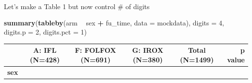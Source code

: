 \documentclass[fleqn,10pt,lineno]{wlpeerj} %
\newenvironment{Shaded}{\begin{snugshade}}{\end{snugshade}}
\newcommand{\DataTypeTok}[1]{\textcolor[rgb]{0.13,0.29,0.53}{#1}}
\newcommand{\DecValTok}[1]{\textcolor[rgb]{0.00,0.00,0.81}{#1}}
\newcommand{\KeywordTok}[1]{\textcolor[rgb]{0.13,0.29,0.53}{\textbf{#1}}}
\newcommand{\NormalTok}[1]{#1}
\newcommand{\OperatorTok}[1]{\textcolor[rgb]{0.81,0.36,0.00}{\textbf{#1}}}
\newcommand{\StringTok}[1]{\textcolor[rgb]{0.31,0.60,0.02}{#1}}
\begin{document}
Let's make a Table 1 but now control \# of digits

\begin{Shaded}
\begin{Highlighting}[]
\KeywordTok{summary}\NormalTok{(}\KeywordTok{tableby}\NormalTok{(arm }\OperatorTok{~}\StringTok{ }\NormalTok{sex }\OperatorTok{+}\StringTok{ }\NormalTok{fu_time, }\DataTypeTok{data =}\NormalTok{ mockdata), }
        \DataTypeTok{digits =} \DecValTok{4}\NormalTok{, }\DataTypeTok{digits.p =} \DecValTok{2}\NormalTok{, }\DataTypeTok{digits.pct =} \DecValTok{1}\NormalTok{)}
\end{Highlighting}
\end{Shaded}

\begin{longtable}[]{@{}lccccr@{}}
\toprule
\begin{minipage}[b]{0.19\columnwidth}\raggedright
\strut
\end{minipage} & \begin{minipage}[b]{0.15\columnwidth}\centering
A: IFL (N=428)\strut
\end{minipage} & \begin{minipage}[b]{0.15\columnwidth}\centering
F: FOLFOX (N=691)\strut
\end{minipage} & \begin{minipage}[b]{0.15\columnwidth}\centering
G: IROX (N=380)\strut
\end{minipage} & \begin{minipage}[b]{0.15\columnwidth}\centering
Total (N=1499)\strut
\end{minipage} & \begin{minipage}[b]{0.06\columnwidth}\raggedleft
p value\strut
\end{minipage}\tabularnewline
\midrule
\endhead
\begin{minipage}[t]{0.19\columnwidth}\raggedright
\textbf{sex}\strut
\end{minipage} & \begin{minipage}[t]{0.15\columnwidth}\centering
\strut
\end{minipage} & \begin{minipage}[t]{0.15\columnwidth}\centering
\strut
\end{minipage} & \begin{minipage}[t]{0.15\columnwidth}\centering
\strut
\end{minipage} & \begin{minipage}[t]{0.15\columnwidth}\centering
\strut
\end{minipage} & \begin{minipage}[t]{0.06\columnwidth}\raggedleft

\end{minipage}
\end{longtable}
\end{document}
